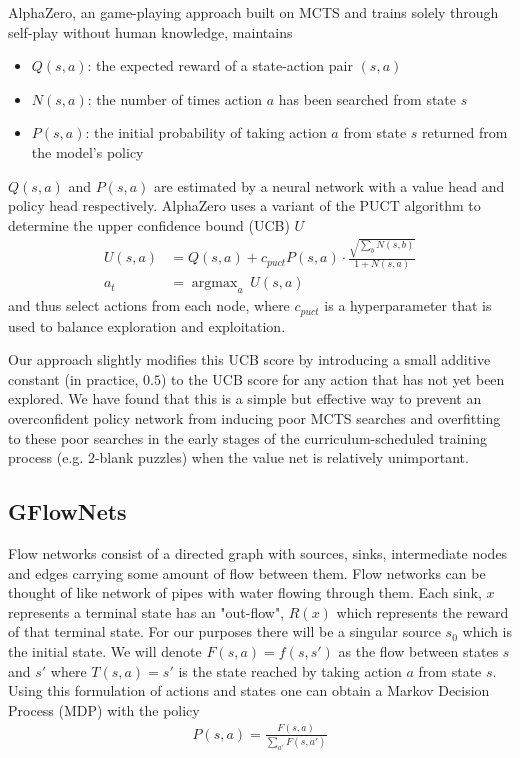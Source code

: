 \documentclass[10pt, reqno, letterpaper, twoside]{amsart}
\begin{document}
AlphaZero\cite{Silver2018}\cite{10.1038/nature16961}, an game-playing approach built on MCTS and trains solely through self-play without human knowledge, maintains
\begin{itemize}
    \item $Q(s,a)$: the expected reward of a state-action pair $(s,a)$
    \item $N(s,a)$: the number of times action $a$ has been searched from state $s$
    \item $P(s,a)$: the initial probability of taking action $a$ from state $s$ returned from the model's policy
\end{itemize}
$Q(s,a)$ and $P(s,a)$ are estimated by a neural network with a value head and policy head respectively. AlphaZero uses a variant of the PUCT algorithm\cite{puct} to determine the upper confidence bound (UCB) $U$
\begin{align}
   U(s,a) &= Q(s,a) + c_{puct}P(s,a) \cdot \frac{\sqrt{\sum_bN(s,b)}}{1+N(s,a)} \\
   a_t &= \mathop{\mathrm{argmax}}_a \  U(s,a)
\end{align}
and thus select actions from each node, where $c_{puct}$ is a hyperparameter that is used to balance exploration and exploitation. 

Our approach slightly modifies this UCB score by introducing a small additive constant (in practice, $0.5$) to the UCB score for any action that has not yet been explored. We have found that this is a simple but effective way to prevent an overconfident policy network from inducing poor MCTS searches and overfitting to these poor searches in the early stages of the curriculum-scheduled training process (e.g. 2-blank puzzles) when the value net is relatively unimportant.

\subsection{GFlowNets}
Flow networks consist of a directed graph with sources, sinks, intermediate nodes and edges carrying some amount of flow between them. Flow networks can be thought of like network of pipes with water flowing through them. Each sink, $x$ represents a terminal state has an "out-flow", $R(x)$ which represents the reward of that terminal state. For our purposes there will be a singular source $s_0$ which is the initial state. We will denote $F(s,a)=f(s,s')$ as the flow between states $s$ and $s'$ where $T(s,a)=s'$ is the state reached by taking action $a$ from state $s$. Using this formulation of actions and states one can obtain a Markov Decision Process (MDP) with the policy
\begin{align}
    P(s,a) = \frac{F(s,a)}{\sum_{a'} F(s,a')}
\end{align}
\end{document}

